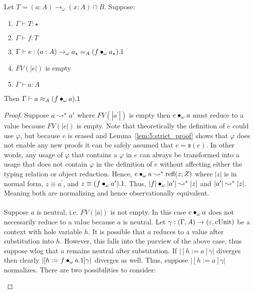 \begin{lemma}
    \label{lem:5:phi_obs_id}
    Let $T = (a : A) \to_\omega (x : A) \cap B$.
    Suppose:
    \begin{enumerate}
        \item $\Gamma \vdash T : \star$
        \item $\Gamma \vdash f : T$
        \item $\Gamma \vdash e : (a : A) \to_\omega a_\star =_A (f \bullet_{\omega} a_\star).1$
        \item $FV(|e|)$ is empty
        \item $\Gamma \vdash a : A$
    \end{enumerate}
    Then $\Gamma \vdash a \approx_A (f \bullet_{\omega} a).1$
\end{lemma}
\begin{proof}
    Suppose $a \leadsto^* a^\prime$ where $FV(|a^\prime|)$ is empty then $e \bullet_{\omega} a$ must reduce to a value because $FV(|e|)$ is empty.
    Note that theoretically the definition of $e$ could use $\varphi$, but because $e$ is erased and Lemma~\ref{lem:5:strict_proof} shows that $\varphi$ does not enable any new proofs it can be safely assumed that $e = \mathfrak{s}(e)$.
    In other words, any usage of $\varphi$ that contains a $\varphi$ in $e$ can always be transformed into a usage that does not contain $\varphi$ in the definition of $e$ without affecting either the typing relation or object reduction.
    Hence, $e \bullet_{\omega} a \leadsto^* \textnormal{refl}(z; Z)$ where $|z|$ is in normal form, $z \equiv a^\prime$, and $z \equiv (f \bullet_{\omega} a^\prime).1$.
    Thus, $|f| \bullet_{\omega} |a^\prime| \leadsto^* |z|$ and $|a^\prime| \leadsto^* |z|$.
    Meaning both are normalizing and hence observationally equivalent.
    \\ \\
    Suppose $a$ is neutral, i.e. $FV(|a|)$ is not empty.
    In this case $e \bullet_{\omega} a$ does not necessarily reduce to a value because $a$ is neutral.
    Let $\gamma : (\Gamma, A) \to (\varepsilon, \textnormal{cUnit})$ be a context with hole variable $h$.
    It is possible that $a$ reduces to a value after substitution into $h$.
    However, this falls into the purview of the above case, thus suppose wlog that $a$ remains neutral after substitution.
    If $|[h := a]\gamma|$ diverges then clearly $|[h := f \bullet_{\omega} a.1]\gamma|$ diverges as well.
    Thus, suppose $|[h := a]\gamma|$ normalizes.
    There are two possibilities to consider:
    \begin{enumerate}

\end{enumerate}
\end{proof}

